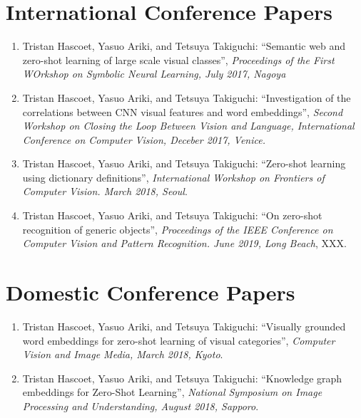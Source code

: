 \section*{International Conference Papers}
\begin{enumerate}

\item Tristan Hascoet, Yasuo Ariki, and Tetsuya Takiguchi:
``Semantic web and zero-shot learning of large scale visual classes'',
\textit{Proceedings of the First WOrkshop on Symbolic Neural Learning, July 2017, Nagoya}

\item Tristan Hascoet, Yasuo Ariki, and Tetsuya Takiguchi:
``Investigation of the correlations between CNN visual features and word embeddings'',
\textit{Second Workshop on Closing the Loop Between Vision and Language, International Conference on Computer Vision, Deceber 2017, Venice.}

\item Tristan Hascoet, Yasuo Ariki, and Tetsuya Takiguchi:
``Zero-shot learning using dictionary definitions'',
\textit{International Workshop on Frontiers of Computer Vision. March 2018, Seoul}.

\item Tristan Hascoet, Yasuo Ariki, and Tetsuya Takiguchi:
``On zero-shot recognition of generic objects'',
\textit{Proceedings of the IEEE Conference on Computer Vision and Pattern Recognition. June 2019, Long Beach}, XXX.

\end{enumerate}

\section*{Domestic Conference Papers}
\begin{enumerate}

\item Tristan Hascoet, Yasuo Ariki, and Tetsuya Takiguchi:
``Visually grounded word embeddings for zero-shot learning of visual categories'',
\textit{Computer Vision and Image Media, March 2018, Kyoto}.

\item Tristan Hascoet, Yasuo Ariki, and Tetsuya Takiguchi:
``Knowledge graph embeddings for Zero-Shot Learning'',
\textit{National Symposium on Image Processing and Understanding, August 2018, Sapporo}.

\end{enumerate}
\label{chap:endPubList}






